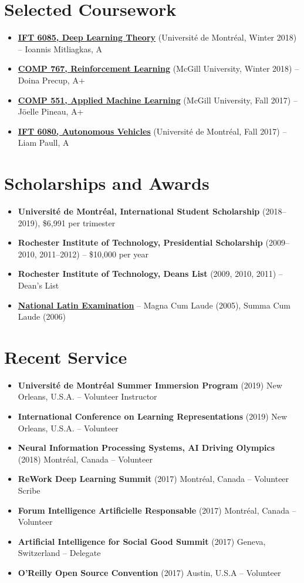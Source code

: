 \documentclass[letterpaper,11pt]{article}
\newcommand{\resumeItem}[2]{
\item\small{
\textbf{#1}{ #2 \vspace{-2pt}}
}
}
\newcommand{\resumeSubItem}[2]{\resumeItem{#1}{#2}}
\newcommand{\resumeSubHeadingListStart}{\begin{itemize}[leftmargin=*]}
\newcommand{\resumeSubHeadingListEnd}{\end{itemize}}
\begin{document}
\begin{justify}
\section{Selected Coursework}
\resumeSubHeadingListStart
\resumeSubItem{\href{http://mitliagkas.github.io/ift6085-dl-theory-class/}{IFT 6085, Deep Learning Theory}}{(Universit\'e de Montr\'eal, Winter 2018) -- Ioannis Mitliagkas, A}
\resumeSubItem{\href{https://www.cs.mcgill.ca/~dprecup/courses/rl.html}{COMP 767, Reinforcement Learning}}{(McGill University, Winter 2018) -- Doina Precup, A+}
\resumeSubItem{\href{https://www.cs.mcgill.ca/~jpineau/comp551/index.html}{COMP 551, Applied Machine Learning}}{(McGill University, Fall 2017) -- J\"oelle Pineau, A+}
\resumeSubItem{\href{http://liampaull.ca/courses/duckietown/index.html}{IFT 6080, Autonomous Vehicles}}{(Universit\'e de Montr\'eal, Fall 2017) -- Liam Paull, A}
\resumeSubHeadingListEnd

\section{Scholarships and Awards}
\resumeSubHeadingListStart
\resumeSubItem{Universit\'e de Montr\'eal, International Student Scholarship}{(2018--2019), \$6,991 per trimester}
\resumeSubItem{Rochester Institute of Technology, Presidential Scholarship}{(2009--2010, 2011--2012) -- \$10,000 per year}
\resumeSubItem{Rochester Institute of Technology, Deans List}{(2009, 2010, 2011) -- Dean's List}
\resumeSubItem{\href{https://www.nle.org/}{National Latin Examination}}{-- Magna Cum Laude (2005), Summa Cum Laude (2006)}
\resumeSubHeadingListEnd

\section{Recent Service}
\resumeSubHeadingListStart
\resumeSubItem{Universit\'e de Montr\'eal Summer Immersion Program}{(2019) New Orleans, U.S.A. -- Volunteer Instructor}
\resumeSubItem{International Conference on Learning Representations}{(2019) New Orleans, U.S.A. -- Volunteer}
\resumeSubItem{Neural Information Processing Systems, AI Driving Olympics}{(2018) Montr\'eal, Canada -- Volunteer}
\resumeSubItem{ReWork Deep Learning Summit}{(2017) Montr\'eal, Canada -- Volunteer Scribe}
\resumeSubItem{Forum Intelligence Artificielle Responsable}{(2017) Montr\'eal, Canada -- Volunteer}
\resumeSubItem{Artificial Intelligence for Social Good Summit}{(2017) Geneva, Switzerland -- Delegate}
\resumeSubItem{O'Reilly Open Source Convention}{(2017) Austin, U.S.A -- Volunteer}
\resumeSubHeadingListEnd



\end{justify}
\end{document}
